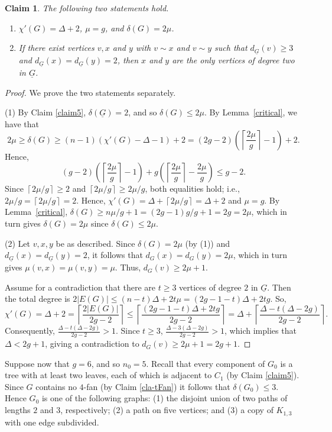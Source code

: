 \documentclass[12pt,oneside]{amsart}
\newtheorem{claim}{Claim}[section]
\newcommand\roundup[1]{\left\lceil#1\right\rceil}
\begin{document}
\begin{claim}\label{cla: chi'} The following two statements hold.
\begin{enumerate}
\item $\chi'(G)=\Delta+2$,  $\mu=g$, and $\delta(G)=2\mu$.
\item If there exist vertices $v, x$ and $y$ with $v\sim x$ and $v\sim y$ such that  $d_{\underline{G}}(v)\geq 3$ and $d_{\underline{G}}(x)=d_{\underline{G}}(y)=2$, then $x$ and $y$ are the only vertices of degree two in $\underline{G}$.
\end{enumerate}
\end{claim}
\begin{proof}
We prove the two statements separately.

(1) By Claim \ref{claim5},
$\delta(\underline{G}) =2$,  and so $\delta(G) \le 2\mu$. By Lemma~\ref{critical}, we have that
$$
2\mu \ge \delta(G)\ge (n-1)(\chi'(G) -\Delta -1)+2= (2g-2)\left(\roundup{\frac{2\mu}g}-1\right) +2.
$$
Hence,
\[
(g-2)\left(\roundup{\frac{2\mu}g} -1\right) + g\left(\roundup{\frac{2\mu}g} -\frac{2\mu}g\right) \le g-2.
\]
Since $\roundup{2\mu/g}\ge 2$ and $\roundup{2\mu/g} \ge 2\mu/g$, both equalities hold; i.e., $2\mu/g = \roundup{2\mu /g}=2$.  Hence,  $\chi'(G) =\Delta +\roundup{2\mu/g} =\Delta +2$ and   $\mu=g$.
By Lemma~\ref{critical}, $\delta(G) \ge n\mu/g +1=(2g-1)g/g+1=2g=2\mu$, which in turn gives  $\delta(G) =2\mu$ since $\delta(G)\leq 2\mu$.

(2) Let $v, x, y$ be as described. Since $\delta(G) = 2\mu$ (by (1)) and $d_{\underline{G}}(x) =d_{\underline{G}}(y) =2$, it follows  that $d_G(x) = d_G(y) = 2\mu$, which in turn gives $\mu(v, x)=\mu(v, y) =\mu$.  Thus, $d_G(v)\ge 2\mu+1$.

Assume for a contradiction that there are  $t\ge 3$ vertices of degree $2$ in $\underline{G}$. Then the total degree is
$2|E(G)| \le (n-t)\Delta + 2t\mu = (2g-1-t) \Delta+2tg$.
So,
$$ \chi'(G)=\Delta +2= \roundup{\frac{2|E(G)|}{2g-2}}
\leq  \roundup{\frac{(2g-1-t)\Delta+2tg}{2g-2}}  = \Delta + \roundup{\frac{\Delta-t(\Delta-2g)}{2g-2}}. $$
Consequently, $\frac{\Delta-t(\Delta-2g)}{2g-2} >1$. Since $t\ge 3$,  $\frac{\Delta-3(\Delta-2g)}{2g-2} >1$, which implies that $\Delta < 2g +1$, giving a contradiction to $d_G(v) \ge 2\mu +1 = 2g+1$.
\end{proof}

Suppose now that $g=6$, and so $n_0 =5$.
Recall that every component of $G_0$ is a tree with at least two leaves, each of which is adjacent to $C_1$ (by Claim \ref{claim5}). Since $G$ contains no $4$-fan (by Claim \ref{cla-tFan}) it follows that $\delta(G_0)\leq 3$.
Hence $G_0$ is one of the following graphs: (1) the disjoint union of two paths of lengths $2$ and $3$, respectively;
(2) a path on five vertices; and (3) a copy of $K_{1,3}$ with one edge subdivided.
\end{document}
